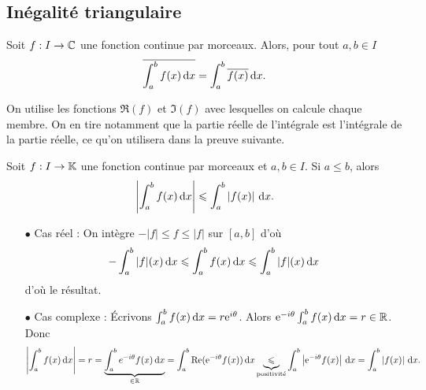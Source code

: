 \documentclass{magnolia}
\begin{document}
\subsection{Inégalité triangulaire}

\begin{proposition}[utile=-1]
Soit $f:I\to\mathbb{C}$ une fonction continue par morceaux. Alors, pour tout $a,b\in I$
\[\overline{\int_{a}^{b} f(x)\,\text{d}x}= \int_{a}^{b} \overline{f(x)}\,\text{d}x.\]
\end{proposition}

\begin{preuve}
On utilise les fonctions $\Re(f)$ et $\Im(f)$ avec lesquelles on calcule chaque membre. On en tire notamment que la partie réelle de l'intégrale est l'intégrale de la partie réelle, ce qu'on utilisera dans la preuve suivante.
\end{preuve}

\begin{proposition}[utile=3,nom=Inégalité triangulaire]
Soit $f:I\to\mathbb{K}$ une fonction continue par morceaux et $a,b\in I$. Si
$a\leq b$, alors
\[\left|\int_{a}^{b} f(x)\,\text{d}x\right|\leqslant \int_{a}^{b} \left|f(x)\right|\,\text{d}x.\]
\end{proposition}

\begin{preuve}
\begin{itemize}
\item[$\bullet$] Cas réel : On intègre $-|f|\leq f\leq |f|$ sur $[a,b]$ d'où $$-\int_{a}^{b} |f|(x)\,\text{d}x\leqslant \int_{a}^{b} f(x)\,\text{d}x \leqslant \int_{a}^{b} |f|(x)\,\text{d}x$$ d'où le résultat.
\item[$\bullet$] Cas complexe : \'Ecrivons $\int_{a}^{b} f(x)\,\text{d}x=r{\rm e}^{i\theta}$. Alors ${\rm e}^{-i\theta}\int_{a}^{b} f(x)\,\text{d}x=r\in \mathbb{R}$. Donc $$\left|\int_{a}^{b} f(x)\,\text{d}x\right|=r=\underbrace{\int_{a}^{b} e^{-i\theta}f(x)\,\text{d}x}_{\in \mathbb{R}}=\int_{a}^{b} \mathop{\rm Re}({\rm e}^{-i\theta}f(x))\,\text{d}x\underbrace{\leqslant}_{\text{positivité}} \int_{a}^{b} \left|{\rm e}^{-i\theta}f(x)\right|\,\text{d}x=\int_{a}^{b} \left|f(x)\right|\,\text{d}x.$$
\end{itemize}
\end{preuve}

\end{document}
